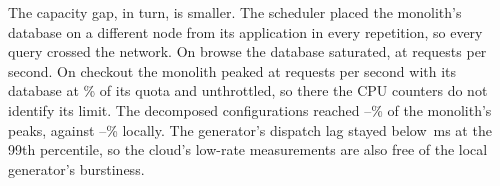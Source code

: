 The capacity gap, in turn, is smaller. The scheduler placed the monolith's database on a different node from its
application in every repetition, so every query crossed the network. On browse the database saturated, at 
requests per second. On checkout the monolith peaked at  requests per second with its
database at \% of its quota and unthrottled, so there the CPU counters do not
identify its limit. The decomposed configurations reached --\% of the monolith's peaks, against
--\% locally. The generator's dispatch lag stayed below
\,ms at the 99th percentile, so the cloud's low-rate measurements are also free of the
local generator's burstiness.

